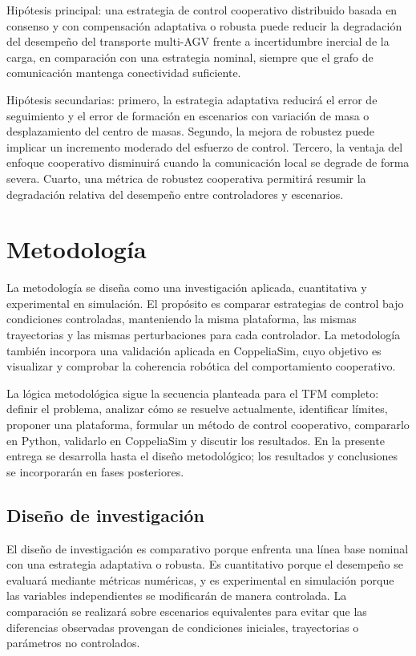 \documentclass[12pt,a4paper]{article}
\begin{document}
Hipótesis principal: una estrategia de control cooperativo distribuido basada en consenso y con compensación adaptativa o robusta puede reducir la degradación del desempeño del transporte multi-AGV frente a incertidumbre inercial de la carga, en comparación con una estrategia nominal, siempre que el grafo de comunicación mantenga conectividad suficiente.

Hipótesis secundarias: primero, la estrategia adaptativa reducirá el error de seguimiento y el error de formación en escenarios con variación de masa o desplazamiento del centro de masas. Segundo, la mejora de robustez puede implicar un incremento moderado del esfuerzo de control. Tercero, la ventaja del enfoque cooperativo disminuirá cuando la comunicación local se degrade de forma severa. Cuarto, una métrica de robustez cooperativa permitirá resumir la degradación relativa del desempeño entre controladores y escenarios.

\section{Metodología}

La metodología se diseña como una investigación aplicada, cuantitativa y experimental en simulación. El propósito es comparar estrategias de control bajo condiciones controladas, manteniendo la misma plataforma, las mismas trayectorias y las mismas perturbaciones para cada controlador. La metodología también incorpora una validación aplicada en CoppeliaSim, cuyo objetivo es visualizar y comprobar la coherencia robótica del comportamiento cooperativo.

La lógica metodológica sigue la secuencia planteada para el TFM completo: definir el problema, analizar cómo se resuelve actualmente, identificar límites, proponer una plataforma, formular un método de control cooperativo, compararlo en Python, validarlo en CoppeliaSim y discutir los resultados. En la presente entrega se desarrolla hasta el diseño metodológico; los resultados y conclusiones se incorporarán en fases posteriores.

\subsection{Diseño de investigación}

El diseño de investigación es comparativo porque enfrenta una línea base nominal con una estrategia adaptativa o robusta. Es cuantitativo porque el desempeño se evaluará mediante métricas numéricas, y es experimental en simulación porque las variables independientes se modificarán de manera controlada. La comparación se realizará sobre escenarios equivalentes para evitar que las diferencias observadas provengan de condiciones iniciales, trayectorias o parámetros no controlados.
\end{document}
